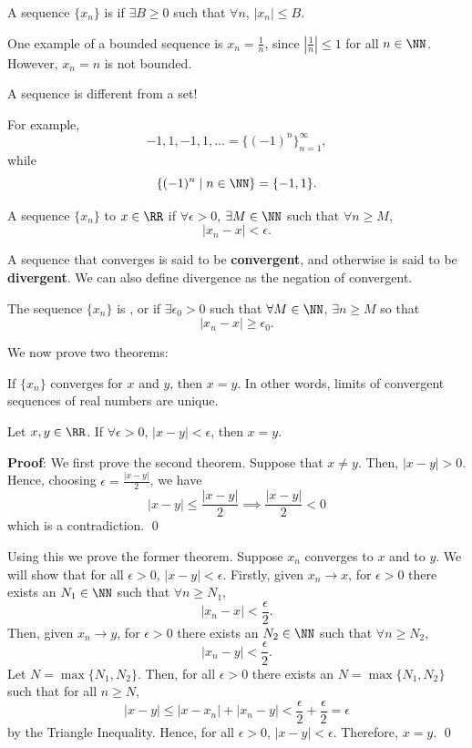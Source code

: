 \begin{definition}
A sequence $\{x_n\}$ is  if $\exists B\geq 0$ such that $\forall n$, $|x_n| \leq B$.
\end{definition}
One example of a bounded sequence is $x_n = \frac{1}{n}$, since $\left|\frac{1}{n}\right| \leq 1$ for all $n\in \NN$. However, $x_n = n$ is not bounded.

\begin{remark}
A sequence is different from a set!
\end{remark}
For example, 
\[
-1,1,-1,1,\dots = \{(-1)^n\}^{\infty}_{n=1},
\]
while 
\[
\{(-1)^n \mid n\in\NN\} = \{-1,1\}.
\]

\begin{definition}
A sequence $\{x_n\}$  to $x\in \RR$ if $\forall \epsilon >0$, $\exists M\in \NN$ such that $\forall n\geq M$, 
\[
|x_n - x| <\epsilon.
\]
\end{definition}
A sequence that converges is said to be \textbf{convergent}, and otherwise is said to be \textbf{divergent}. We can also define divergence as the negation of convergent.
\begin{negation}
The sequence $\{x_n\}$ is , or  if $\exists \epsilon_0 >0$ such that $\forall M\in \NN$, $\exists n \geq M$ so that 
\[
|x_n-x|\geq \epsilon_0.
\]
\end{negation}

We now prove two theorems:
\begin{theorem}
If $\{x_n\}$ converges for $x$ and $y$, then $x=y$. In other words, limits of convergent sequences of real numbers are unique.
\end{theorem}
\begin{theorem}
Let $x,y\in \RR$. If $\forall \epsilon>0$, $|x-y|<\epsilon$, then $x=y$.
\end{theorem}
\textbf{Proof}: We first prove the second theorem. Suppose that $x\neq y$. Then, $|x-y|>0$. Hence, choosing $\epsilon  = \frac{|x-y|}{2}$, we have 
\[
|x-y| \leq \frac{|x-y|}{2} \implies \frac{|x-y|}{2} < 0
\]
which is a contradiction. \qed 

Using this we prove the former theorem. Suppose $x_n$ converges to $x$ and to $y$. We will show that for all $\epsilon>0$, $|x-y|<\epsilon$. Firstly, given $x_n\to x$, for $\epsilon>0$ there exists an $N_1\in \NN$ such that $\forall n\geq N_1$, 
\[
|x_n-x|<\frac{\epsilon}{2}.
\]
Then, given $x_n\to y$, for $\epsilon>0$ there exists an $N_2\in \NN$ such that $\forall n\geq N_2$, 
\[
|x_n-y|<\frac{\epsilon}{2}.
\]
Let $N = \max \{N_1,N_2\}$. Then, for all $\epsilon>0$ there exists an $N = \max\{N_1,N_2\}$ such that for all $n\geq N$, 
\[
|x-y| \leq |x-x_n|+|x_n - y| <\frac{\epsilon}{2} + \frac{\epsilon}{2} = \epsilon
\]
by the Triangle Inequality. Hence, for all $\epsilon >0$, $|x-y|<\epsilon$. Therefore, $x=y$. \qed 

